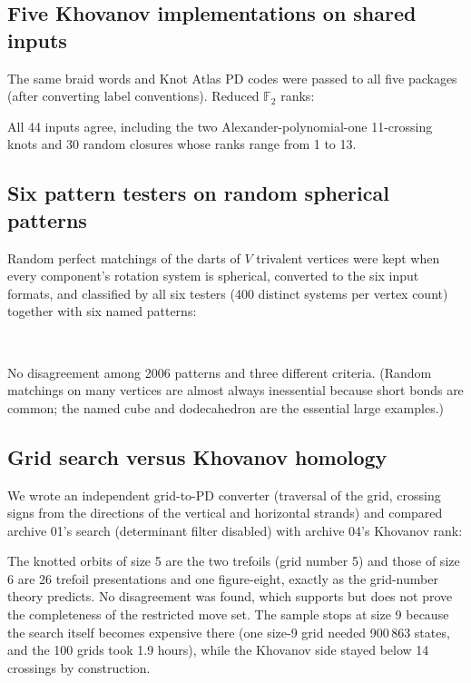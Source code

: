 \documentclass[11pt]{article}
\theoremstyle{remark}
\newcommand{\F}{\mathbb{F}_2}
\begin{document}
\subsection{Five Khovanov implementations on shared inputs}
The same braid words and Knot Atlas PD codes were passed to all five packages
(after converting label conventions). Reduced $\F$ ranks:

\begin{center}\small

\end{center}

All 44 inputs agree, including the two Alexander-polynomial-one 11-crossing
knots and 30 random closures whose ranks range from 1 to 13.

\subsection{Six pattern testers on random spherical patterns}
Random perfect matchings of the darts of $V$ trivalent vertices were kept
when every component's rotation system is spherical, converted to the six
input formats, and classified by all six testers (400 distinct systems per
vertex count) together with six named patterns:

\begin{center}\small
\\[6pt]

\end{center}

No disagreement among 2006 patterns and three different criteria. (Random
matchings on many vertices are almost always inessential because short bonds
are common; the named cube and dodecahedron are the essential large examples.)

\subsection{Grid search versus Khovanov homology}
\label{sec:xval-grid}
We wrote an independent grid-to-PD converter (traversal of the grid, crossing
signs from the directions of the vertical and horizontal strands) and compared
archive 01's search (determinant filter disabled) with archive 04's Khovanov
rank:

\begin{center}\small
{}
\end{center}

The knotted orbits of size 5 are the two trefoils (grid number 5) and those of
size 6 are 26 trefoil presentations and one figure-eight, exactly as the
grid-number theory predicts. No disagreement was found, which supports but
does not prove the completeness of the restricted move set. The sample stops
at size 9 because the search itself becomes expensive there (one size-9 grid
needed 900\,863 states, and the 100 grids took 1.9 hours), while the Khovanov
side stayed below 14 crossings by construction.
\end{document}
